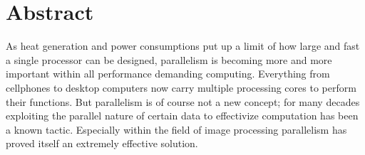 \begingroup
\let\clearpage\relax
\let\cleardoublepage\relax
\let\cleardoublepage\relax

\chapter*{Abstract}
\begin{comment}
\TODO{This is a very rough draft written after 24 hours of sleeplessness. Be
ruthless in your editing/rewriting/deleting/whatever.} As heat generation and
power consumption has put up a ceiling for how large and fast processors can be
built, parallelism has risen to become the de facto standard for computing.
Everything from cellphones to desktop computers now carry multiple processing
cores to perform their functions. But parallelism is of course not a new
concept; for many decades exploiting the parallel nature of certain data to
effectivize computation has been a known tactic. Especially within the field of
image processing has parallelism proved itself a good fit.

Although MIMD-systems have taken hold as the dominant class of parallel systems
for general computing, we wanted to explore alternatives which may work better
for certain applications. The result of this project is the computer ``256
Shades of Gray``, an array based SIMD-architecture optimized for very
parallelizable tasks such as image processing.

``256 Shades of Gray``(henceforth refered to as ``TSOG``\TODO{Or?}) consists of
a custom PCB-design, a microprocessor system control unit and a FPGA on which
our SIMD-architecture is implemented. It accepts input through a SD-card reader
(with RS-232 and USB as backup), and shows its output through a custom VGA
controller.

We have been greatly inspired by the Goodyear MPP architecture, which clearly
shows in our design. Simplicity was strived for at all times to be able to fit
as many cores as possible within limited resources.

In the end the design has gone through fairly rigorous testing, and has met both
the functional and non-functional requirements we set out to meet. The
architecture has shown itself a good fit for multiple common image processing
tasks.
\end{comment}
As heat generation and power consumptions put up a limit of how large and fast
a single processor can be designed, parallelism is becoming more and more important
within all performance demanding computing. Everything from cellphones to desktop
computers now carry multiple processing cores to perform their functions. But
parallelism is of course not a new concept; for many decades exploiting the
parallel nature of certain data to effectivize computation has been a known tactic.
Especially within the field of image processing parallelism has proved itself an
extremely effective solution.

